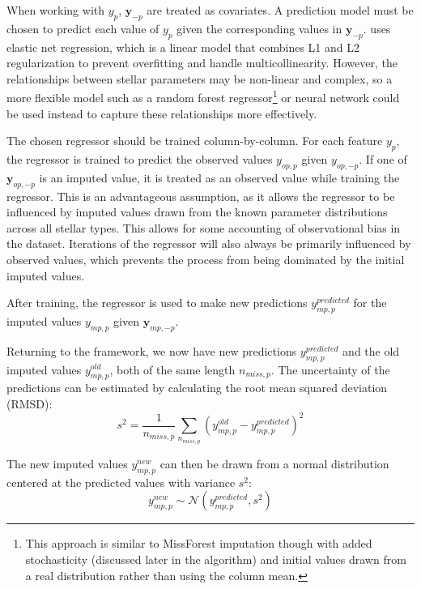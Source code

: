 \documentclass[preprint]{aastex631}
\begin{document}
When working with $y_p$, $\mathbf{y}_{-p}$ are treated as covariates. A prediction model must be chosen to predict each value of $y_p$ given the corresponding values in $\mathbf{y}_{-p}$. \citet{weiGSimpGibbsSampler2018} uses elastic net regression, which is a linear model that combines L1 and L2 regularization to prevent overfitting and handle multicollinearity. However, the relationships between stellar parameters may be non-linear and complex, so a more flexible model such as a random forest regressor\footnote{This approach is similar to MissForest imputation \citep{stekhovenMissForestnonparametricMissingValue2012} though with added stochasticity (discussed later in the algorithm) and initial values drawn from a real distribution rather than using the column mean.} or neural network could be used instead to capture these relationships more effectively.

The chosen regressor should be trained column-by-column. For each feature $y_p$, the regressor is trained to predict the observed values $y_{op,p}$ given $y_{op,-p}$. If one of $\mathbf{y}_{op,-p}$ is an imputed value, it is treated as an observed value while training the regressor. This is an advantageous assumption, as it allows the regressor to be influenced by  imputed values drawn from the known parameter distributions across all stellar types. This allows for some accounting of observational bias in the dataset. Iterations of the regressor will also always be primarily influenced by observed values, which prevents the process from being dominated by the initial imputed values.

After training, the regressor is used to make new predictions $y_{mp,p}^{predicted}$ for the imputed values $y_{mp,p}$ given $\mathbf{y}_{mp,-p}$.

Returning to the \citet{weiGSimpGibbsSampler2018} framework, we now have new predictions $y_{mp,p}^{predicted}$ and the old imputed values $y_{mp,p}^{old}$, both of the same length $n_{miss,p}$. The uncertainty of the predictions can be estimated by calculating the root mean squared deviation (RMSD):
\begin{equation}
  s^2 = \frac{1}{n_{miss,p}} \sum_{n_{miss,p}}\left(y_{mp,p}^{old} - y_{mp,p}^{predicted}\right)^2
\end{equation}

The new imputed values $y_{mp,p}^{new}$ can then be drawn from a normal distribution centered at the predicted values with variance $s^2$:
\begin{equation}
  y_{mp,p}^{new} \sim \mathcal{N}\left(y_{mp,p}^{predicted}, s^2\right)
\end{equation}
\end{document}
